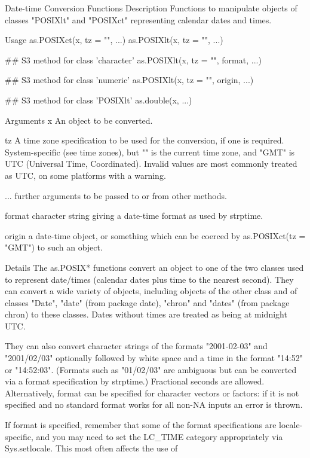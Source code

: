 Date-time Conversion Functions
Description
Functions to manipulate objects of classes "POSIXlt" and "POSIXct" representing calendar dates and times. 

Usage
as.POSIXct(x, tz = "", ...)
as.POSIXlt(x, tz = "", ...)

## S3 method for class 'character'
as.POSIXlt(x, tz = "", format, ...)

## S3 method for class 'numeric'
as.POSIXlt(x, tz = "", origin, ...)

## S3 method for class 'POSIXlt'
as.double(x, ...)

Arguments
x An object to be converted.
 
tz A time zone specification to be used for the conversion, if one is required. System-specific (see time zones), but "" is the current time zone, and "GMT" is UTC (Universal Time, Coordinated). Invalid values are most commonly treated as UTC, on some platforms with a warning.
 
... further arguments to be passed to or from other methods.
 
format character string giving a date-time format as used by strptime.
 
origin a date-time object, or something which can be coerced by as.POSIXct(tz = "GMT") to such an object.
 

Details
The as.POSIX* functions convert an object to one of the two classes used to represent date/times (calendar dates plus time to the nearest second). They can convert a wide variety of objects, including objects of the other class and of classes "Date", "date" (from package date), "chron" and "dates" (from package chron) to these classes. Dates without times are treated as being at midnight UTC. 

They can also convert character strings of the formats "2001-02-03" and "2001/02/03" optionally followed by white space and a time in the format "14:52" or "14:52:03". (Formats such as "01/02/03" are ambiguous but can be converted via a format specification by strptime.) Fractional seconds are allowed. Alternatively, format can be specified for character vectors or factors: if it is not specified and no standard format works for all non-NA inputs an error is thrown. 

If format is specified, remember that some of the format specifications are locale-specific, and you may need to set the LC_TIME category appropriately via Sys.setlocale. This most often affects the use of %


